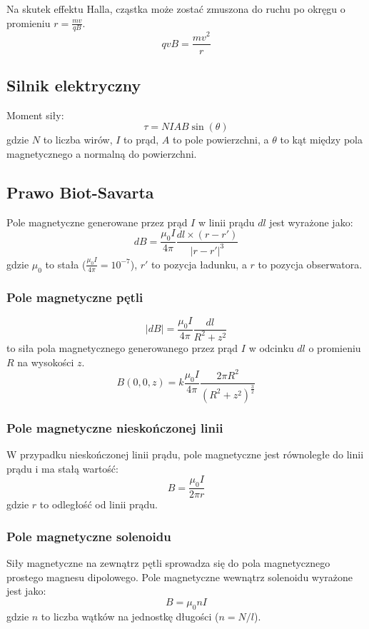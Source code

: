 \documentclass{../notatki}
\begin{document}
Na skutek effektu Halla, cząstka może zostać zmuszona do ruchu po okręgu
o promieniu $r = \frac{mv}{qB}$.
$$
qvB = \frac{mv^2}{r}
$$

\subsection{Silnik elektryczny}

Moment siły:
$$
\tau = NIAB \sin(\theta)
$$
gdzie $N$ to liczba wirów, $I$ to prąd, $A$ to pole powierzchni, a
$\theta$ to kąt między pola magnetycznego a normalną do powierzchni.

\subsection{Prawo Biot-Savarta}

Pole magnetyczne generowane przez prąd $I$ w linii prądu $dl$ jest
wyrażone jako:
$$
dB = \frac{\mu_0 I}{4 \pi} \frac{dl \times (r - r')}{|r - r'|^3}
$$
gdzie $\mu_0$ to stała ($\frac{\mu_0 I}{4 \pi} = 10^{-7}$), $r'$ to pozycja
ładunku, a $r$ to pozycja obserwatora.

\subsubsection{Pole magnetyczne pętli}

$$
|dB| = \frac{\mu_0 I}{4 \pi} \frac{dl}{R^2 + z^2}
$$
to siła pola magnetycznego generowanego przez prąd $I$ w odcinku $dl$
o promieniu $R$ na wysokości $z$.
$$
B(0, 0, z) = k \frac{\mu_0 I}{4 \pi} \frac{2 \pi R^2}{(R^2 + z^2)^{\frac{3}{2}}}
$$

\subsubsection{Pole magnetyczne nieskończonej linii}

W przypadku nieskończonej linii prądu, pole magnetyczne jest
równoległe do linii prądu i ma stałą wartość:
$$
B = \frac{\mu_0 I}{2 \pi r}
$$
gdzie $r$ to odległość od linii prądu.

\subsubsection{Pole magnetyczne solenoidu}

Siły magnetyczne na zewnątrz pętli sprowadza się do pola magnetycznego
prostego magnesu dipolowego. Pole magnetyczne wewnątrz solenoidu wyrażone jest
jako:
$$
B = \mu_0 nI
$$
gdzie $n$ to liczba wątków na jednostkę długości ($n = N/l$).
\end{document}
